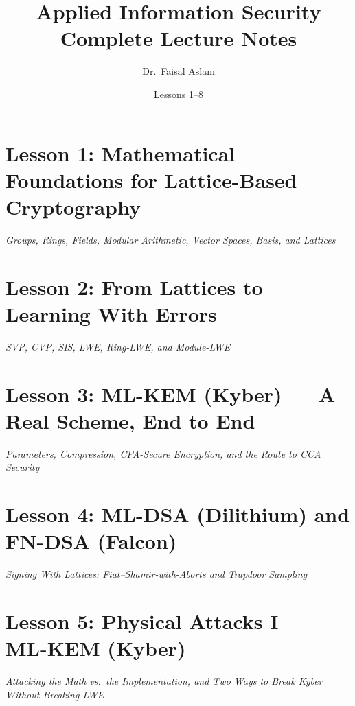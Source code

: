 \documentclass[11pt,a4paper,oneside]{book}
\title{\textbf{Applied Information Security}\\[6pt]
\large Complete Lecture Notes}
\author{Dr.\ Faisal Aslam}
\date{Lessons 1--8}
\begin{document}
\maketitle
\tableofcontents

\chapter{Lesson 1: Mathematical Foundations for Lattice-Based Cryptography}
\begin{center}
\large\itshape Groups, Rings, Fields, Modular Arithmetic, Vector Spaces, Basis, and Lattices
\end{center}
\vspace{0.4cm}


\chapter{Lesson 2: From Lattices to Learning With Errors}
\begin{center}
\large\itshape SVP, CVP, SIS, LWE, Ring-LWE, and Module-LWE
\end{center}
\vspace{0.4cm}


\chapter{Lesson 3: ML-KEM (Kyber) --- A Real Scheme, End to End}
\begin{center}
\large\itshape Parameters, Compression, CPA-Secure Encryption, and the Route to CCA Security
\end{center}
\vspace{0.4cm}


\chapter{Lesson 4: ML-DSA (Dilithium) and FN-DSA (Falcon)}
\begin{center}
\large\itshape Signing With Lattices: Fiat--Shamir-with-Aborts and Trapdoor Sampling
\end{center}
\vspace{0.4cm}


\chapter{Lesson 5: Physical Attacks I --- ML-KEM (Kyber)}
\begin{center}
\large\itshape Attacking the Math vs.\ the Implementation, and Two Ways to Break Kyber Without Breaking LWE
\end{center}
\vspace{0.4cm}

\end{document}
